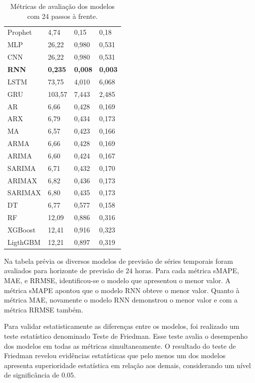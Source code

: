 \begin{table}[!htb]
	\centering
	\caption{Métricas de avaliação dos modelos com 24 passos à frente.}
	\label{tab:metrics}


	
	\begin{tabular}{llll}
		\hline
		\text{Modelo} & \text{sMAPE} & \text{MAE} & \text{RRMSE} \\
		\hline
		Prophet & 4,74 & 0,15 & 0,18 \\
		MLP & 26,22 & 0,980 & 0,531 \\
		CNN & 26,22 & 0,980 & 0,531 \\
		\textbf{RNN} & \textbf{0,235} & \textbf{0,008} & \textbf{0,003} \\
		LSTM & 73,75 & 4,010 & 6,068 \\
		GRU & 103,57 & 7,443 & 2,485 \\
		AR & 6,66 & 0,428 & 0,169 \\
		ARX & 6,79 & 0,434 & 0,173 \\
		MA & 6,57 & 0,423 & 0,166 \\
		ARMA & 6,66 & 0,428 & 0,169 \\
		ARIMA & 6,60 & 0,424 & 0,167 \\
		SARIMA & 6,71 & 0,432 & 0,170 \\
		ARIMAX & 6,82 & 0,436 & 0,173 \\
		SARIMAX & 6,80 & 0,435 & 0,173 \\
		DT & 6,77 & 0,577 & 0,158 \\
		RF & 12,09 & 0,886 & 0,316 \\
		XGBoost & 12,41 & 0,916 & 0,323 \\
		LigthGBM & 12,21 & 0,897 & 0,319 \\
		\hline
	\end{tabular}
\end{table}

Na tabela prévia os diversos modelos de previsão de séries temporais foram avaliados para horizonte de previsão de $24$ horas. Para cada métrica sMAPE, MAE, e RRMSE, identificou-se o modelo que apresentou o menor valor. A métrica sMAPE apontou que o modelo RNN obteve o menor valor. Quanto à métrica MAE, novamente o modelo RNN demonstrou o menor valor e com a métrica RRMSE também.

Para validar estatisticamente as diferenças entre os modelos, foi realizado um teste estatístico denominado Teste de Friedman. Esse teste avalia o desempenho dos modelos em todas as métricas simultaneamente. O resultado do teste de Friedman revelou evidências estatísticas que pelo menos um dos modelos apresenta superioridade estatística em relação aos demais, considerando um nível de significância de $0.05$.



